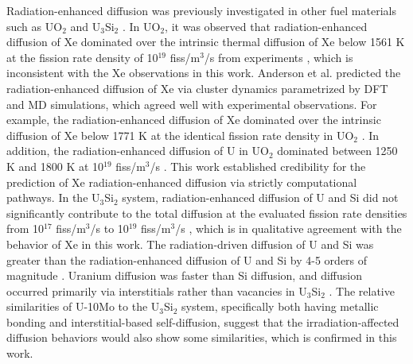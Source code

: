 \documentclass[preprint,12pt]{elsarticle}
\begin{document}
\indent Radiation-enhanced diffusion was previously investigated in other fuel materials such as UO$_{2}$ \cite{cooper2021irradiation, andersson2014atomistic} and U$_{3}$Si$_{2}$ \cite{matthews2020cluster}. In UO$_{2}$, it was observed that radiation-enhanced diffusion of Xe dominated over the intrinsic thermal diffusion of Xe below 1561 K at the fission rate density of 10$^{19}$ fiss/m$^{3}$/s from experiments \cite{turnbull1982diffusion}, which is inconsistent with the Xe observations in this work. Anderson et al. \cite{andersson2014atomistic} predicted the radiation-enhanced diffusion of Xe via cluster dynamics parametrized by DFT and MD simulations, which agreed well with experimental observations. For example, the radiation-enhanced diffusion of Xe dominated over the intrinsic diffusion of Xe below 1771 K at the identical fission rate density in UO$_{2}$ \cite{turnbull1982diffusion, andersson2014atomistic}. In addition, the radiation-enhanced diffusion of U in UO$_{2}$ dominated between 1250 K and 1800 K at 10$^{19}$ fiss/m$^{3}$/s \cite{matthews2020cluster}. This work established credibility for the prediction of Xe radiation-enhanced diffusion via strictly computational pathways. In the U$_{3}$Si$_{2}$ system, radiation-enhanced diffusion of U and Si did not significantly contribute to the total diffusion at the evaluated fission rate densities from 10$^{17}$ fiss/m$^{3}$/s to 10$^{19}$ fiss/m$^{3}$/s \cite{cooper2021irradiation}, which is in qualitative agreement with the behavior of Xe in this work. The radiation-driven diffusion of U and Si was greater than the radiation-enhanced diffusion of U and Si by 4-5 orders of magnitude \cite{cooper2021irradiation}. Uranium diffusion was faster than Si diffusion, and diffusion occurred primarily via interstitials rather than vacancies in U$_{3}$Si$_{2}$ \cite{cooper2021irradiation, andersson2019density}. The relative similarities of U-10Mo to the U$_{3}$Si$_{2}$ system, specifically both having metallic bonding and interstitial-based self-diffusion, suggest that the irradiation-affected diffusion behaviors would also show some similarities, which is confirmed in this work.
\end{document}
